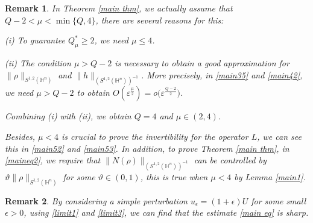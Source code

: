 \documentclass[11pt]{article}
\newtheorem{remark}{Remark}[section]
\begin{document}
\begin{remark}
{\rm In Theorem \ref{main thm}, we actually assume that $Q-2<\mu<\min\{Q,4\}$,
there are several reasons for this:

(i) To guarantee $Q_\mu^*\geq2$, we need $\mu\leq4$.

(ii)  The condition $\mu >Q-2$ is necessary to obtain a good approximation for $\|\rho\|_{S^{1,2}(\mathbb{H}^{n})}$
  and   $\|h\|_{(S^{1,2}(\mathbb{H}^{n}))^{-1}}$.
  More precisely, in
 \eqref{main35} and \eqref{main42}, we need $\mu >Q-2$ to obtain  $O(\varepsilon^{\frac{\mu}{2}})=o\big(\varepsilon^{\frac{Q-2}{2}}\big)$.


 Combining (i) with (ii), we obtain $Q=4$ and $\mu\in(2,4)$.

Besides, $\mu<4$ is crucial to prove the invertibility for the operator $L$, we can see this in
\eqref{main52} and \eqref{main53}.
In addition,
to prove Theorem \ref{main thm}, in \eqref{maineq2}, we require that $\|N(\rho)\|_{(S^{1,2}(\mathbb{H}^{n}))^{-1}}$ can be controlled by $\vartheta\|\rho\|_{S^{1,2}(\mathbb{H}^{n})}$ for some $\vartheta\in (0,1)$,
this
 is true when $\mu<4$ by
  Lemma \ref{main1}. %
  }
\end{remark}

\begin{remark}
{\rm By considering a simple perturbation $u_\epsilon=(1+\epsilon)U$ for some small $\epsilon>0$, using \eqref{limit1} and \eqref{limit3}, we can find that the estimate \eqref{main eq} is sharp.}
\end{remark}


\end{document}
